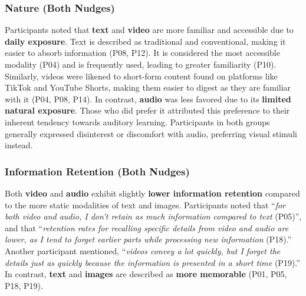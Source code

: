 \subsubsection{Nature (Both Nudges)}
Participants noted that \textbf{text} and \textbf{video} are more familiar and accessible due to \textbf{daily exposure}. Text is described as traditional and conventional, making it easier to absorb information (P08, P12). It is considered the most accessible modality (P04) and is frequently used, leading to greater familiarity (P10). Similarly, videos were likened to short-form content found on platforms like TikTok and YouTube Shorts, making them easier to digest as they are familiar with it (P04, P08, P14).
In contrast, \textbf{audio} was less favored due to its \textbf{limited natural exposure}. Those who did prefer it attributed this preference to their inherent tendency towards auditory learning. Participants in both groups generally expressed disinterest or discomfort with audio, preferring visual stimuli instead. 

\subsubsection{Information Retention (Both Nudges)}
Both \textbf{video} and \textbf{audio} exhibit slightly \textbf{lower information retention} compared to the more static modalities of text and images. Participants noted that ``\textit{for both video and audio, I don’t retain as much information compared to text} (P05)'', and that ``\textit{retention rates for recalling specific details from video and audio are lower, as I tend to forget earlier parts while processing new information} (P18).''  Another participant mentioned, ``\textit{videos convey a lot quickly, but I forget the details just as quickly because the information is presented in a short time} (P19).'' In contrast, \textbf{text} and \textbf{images} are described as \textbf{more memorable} (P01, P05, P18, P19).

